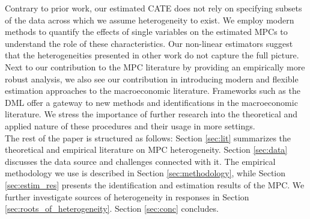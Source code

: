 Contrary to prior work, our estimated CATE does not rely on specifying subsets of the data across which we assume heterogeneity to exist. We employ modern methods to quantify the effects of single variables on the estimated MPCs to understand the role of these characteristics. Our non-linear estimators suggest that the heterogeneities presented in other work do not capture the full picture. Next to our contribution to the MPC literature by providing an empirically more robust analysis, we also see our contribution in introducing modern and flexible estimation approaches to the macroeconomic literature. Frameworks such as the DML offer a gateway to new methods and identifications in the macroeconomic literature. We stress the importance of further research into the theoretical and applied nature of these procedures and their usage in more settings. \\
The rest of the paper is structured as follows: Section \ref{sec:lit} summarizes the theoretical and empirical literature on MPC heterogeneity. Section \ref{sec:data} discusses the data source and challenges connected with it. The empirical methodology we use is described in Section \ref{sec:methodology}, while Section \ref{sec:estim_res} presents the identification and estimation results of the MPC. We further investigate sources of heterogeneity in responses in Section \ref{sec:roots_of_heterogeneity}. Section \ref{sec:conc} concludes.
